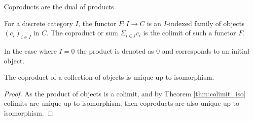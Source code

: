 \begin{remark}
	Coproducts are the dual of products.
\end{remark}

\begin{definition}
	For a discrete category $I$, the functor $F:I\to C$ is an $I$-indexed family
	of objects $(c_i)_{i\in I}$ in $C$. The coproduct or sum $\Sigma_{i\in I} c_i$
	is the colimit of such a functor $F$.
	\parencite{leinster:basic_category_theory}
\end{definition}

\begin{remark}
	In the case where $I=\underline{0}$ the product is denoted as $0$ and
	corresponds to an initial object.
\end{remark}

\begin{theorem}
	The coproduct of a collection of objects is unique up to isomorphism.

	\begin{proof}
		As the product of objects is a colimit, and by Theorem \ref{thm:colimit_iso}
		colimits are unique up to isomorphism, then coproducts are also unique up to
		isomorphism.
	\end{proof}
\end{theorem}